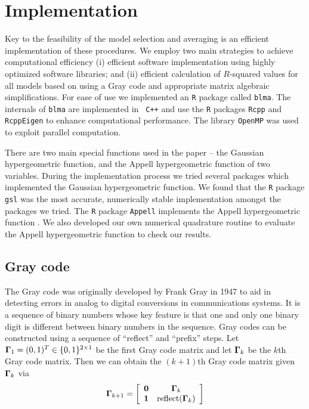 {%


\section{Implementation}
\label{sec:implementation}

\noindent Key to the feasibility of the model selection and averaging is an
efficient implementation of these procedures. We employ two main strategies to
achieve computational efficiency (i) efficient software implementation using
highly optimized software libraries; and (ii) efficient calculation of
$R$-squared values for all models based on using a Gray code and appropriate
matrix algebraic simplifications.  For ease of use we implemented an {\tt R}
package called {\tt blma}.  The internals of {\tt blma} are implemented in {\tt
C++} and use the {\tt R} packages \texttt{Rcpp} and \texttt{RcppEigen} to
enhance computational performance. The library {\tt OpenMP} was used to exploit
parallel computation.

There are two main special functions used in the paper -- the Gaussian
hypergeometric function, and the Appell hypergeometric function of two
variables. During the implementation process we tried several packages which
implemented the Gaussian hypergeometric function.  We found that the {\tt R}
package {\tt gsl} \citep{Hankin2006} was the most accurate, numerically stable
implementation amongst the packages we tried. The {\tt R} package {\tt Appell}
implements the Appell hypergeometric function \citep{Bove2013}. We also
developed our own numerical quadrature routine to evaluate the Appell
hypergeometric function to check our results.

\subsection{Gray code} 
\label{sec:GrayCode}

\noindent The Gray code was originally developed by Frank Gray in 1947
\cite[][Section 22.3]{PressEtal2007} to aid in detecting errors in analog to
digital conversions in communications systems. It is a sequence of binary
numbers whose key feature is that one and only one binary digit is different
between binary numbers in the sequence.  Gray codes can be constructed using a
sequence of ``reflect'' and ``prefix'' steps.  Let ${\boldsymbol \Gamma}_1 = (0,1)^T \in
\{0,1\}^{2\times 1}$ be the first Gray code matrix and let ${\boldsymbol \Gamma}_k$ be the
$k$th Gray code matrix. Then we can obtain the $(k+1)$th Gray code matrix given
${\boldsymbol \Gamma}_k$ via 
$$
\displaystyle {\boldsymbol\Gamma}_{k+1} = \left[\begin{array}{cc}
{\bf0} & {\boldsymbol \Gamma}_k \\
{\bf 1}  & \mbox{reflect}({\boldsymbol \Gamma}_k)
\end{array} \right]
$$ 

}
